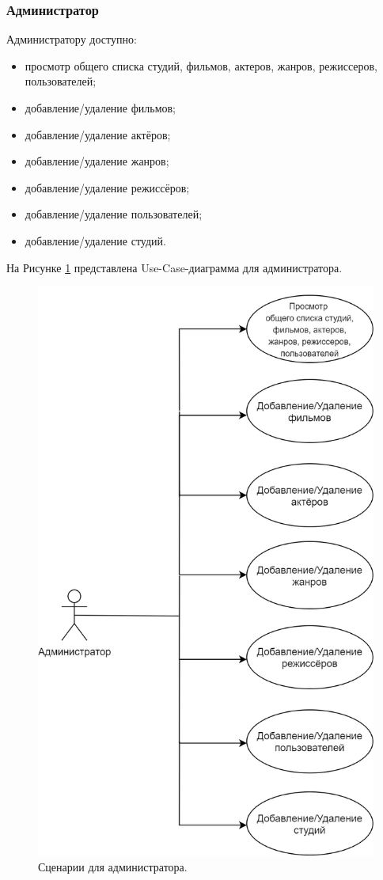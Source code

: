 \subsubsection{Администратор}
Администратору доступно:
\begin{itemize}
	\item[1)] просмотр общего списка студий, фильмов, актеров, жанров, режиссеров, пользователей;
	\item[2)] добавление/удаление фильмов;
	\item[3)] добавление/удаление актёров;
	\item[4)] добавление/удаление жанров;
	\item[5)] добавление/удаление режиссёров;
	\item[6)] добавление/удаление пользователей;
	\item[7)] добавление/удаление студий.  
\end{itemize}
На Рисунке \ref{img:UseCaseAdmin} представлена Use-Case-диаграмма для администратора.
\begin{figure}[h!]
	\centering
	\includegraphics[scale=0.3]{img/UseCaseAdmin.png}
	\caption{Сценарии для администратора.}
	\label{img:UseCaseAdmin}
\end{figure}
\newpage


